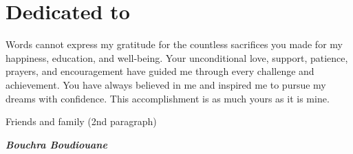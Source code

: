\chapter*{Dedicated to}

  \begin{dedication}
     Words cannot express my gratitude for the countless sacrifices you made for my happiness, education, and well-being. Your unconditional love, support, patience, prayers, and encouragement have guided me through every challenge and achievement. You have always believed in me and inspired me to pursue my dreams with confidence. This accomplishment is as much yours as it is mine.
    
    
    \par   %
    \vspace{1\baselineskip}
    
    Friends and family (2nd paragraph)

    \vspace{\baselineskip}
    \textbf{\textit{Bouchra Boudiouane}}
  \end{dedication}
